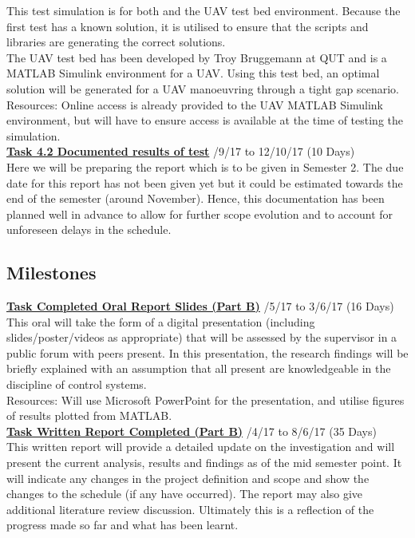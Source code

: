 \documentclass[11pt,draftd]{article}
\begin{document}
\begin{appendices}
	\noindent This test simulation is for both \cite{zylong} and the UAV test bed environment. Because the first test has a known solution, it is utilised to ensure that the scripts and libraries are generating the correct solutions. \\
	The UAV test bed has been developed by Troy Bruggemann at QUT and is a MATLAB Simulink environment for a UAV. Using this test bed, an optimal solution will be generated for a UAV manoeuvring through a tight gap scenario. \\
	Resources: Online access is already provided to the UAV MATLAB Simulink environment, but will have to ensure access is available at the time of testing the simulation.\\
	
	\noindent\underline{\textbf{Task 4.2 Documented results of test}} /9/17 to 12/10/17 (10 Days) \\
	
	\noindent Here we will be preparing the report which is to be given in Semester 2. The due date for this report has not been given yet but it could be estimated towards the end of the semester (around November). Hence, this documentation has been planned well in advance to allow for further scope evolution and to account for unforeseen delays in the schedule.
	
	\subsection{Milestones}
	\underline{\textbf{Task Completed Oral Report Slides (Part B)}} /5/17 to 3/6/17 (16 Days) \\
	
	\noindent This oral will take the form of a digital presentation (including slides/poster/videos as appropriate) that will be assessed by the supervisor in a public forum with peers present. In this presentation, the research findings will be briefly explained with an assumption that all present are knowledgeable in the discipline of control systems. \\
	Resources: Will use Microsoft PowerPoint for the presentation, and utilise figures of results plotted from MATLAB. \\
	
	\noindent\underline{\textbf{Task Written Report Completed (Part B)}} /4/17 to 8/6/17 (35 Days) \\
	
	\noindent This written report will provide a detailed update on the investigation and will present the current analysis, results and findings as of the mid semester point. It will indicate any changes in the project definition and scope and show the changes to the schedule (if any have occurred). The report may also give additional literature review discussion. Ultimately this is a reflection of the progress made so far and what has been learnt. \\
		

\end{appendices}
\end{document}
